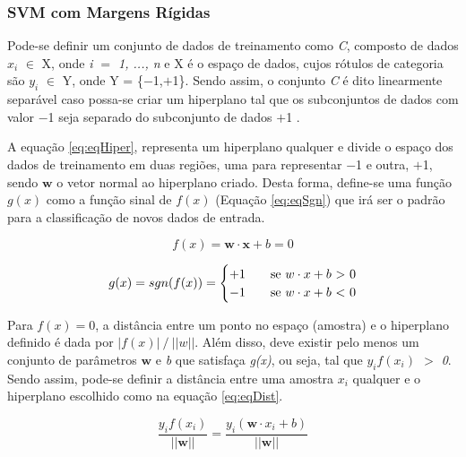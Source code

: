 \subsubsection{SVM com Margens Rígidas}

Pode-se definir um conjunto de dados de treinamento como \textit{C}, composto de dados \textit{$x_i$} $\in$ X, onde \textit{i $=$ 1, ..., n} e X é o espaço de dados, cujos rótulos de categoria são \textit{$y_i$} $\in$ Y, onde Y = \{$-$1,$+$1\}. Sendo assim, o conjunto \textit{C} é dito linearmente separável caso possa-se criar um hiperplano tal que os subconjuntos de dados com valor $-$1 seja separado do subconjunto de dados $+$1 .

A equação \ref{eq:eqHiper}, representa um hiperplano qualquer e divide o espaço dos dados de treinamento em duas regiões, uma para representar $-$1 e outra, $+$1, sendo $\boldsymbol{w}$ o vetor normal ao hiperplano criado. Desta forma, define-se uma função \textit{$g(x)$} como a função sinal de \textit{$f(x)$} (Equação \ref{eq:eqSgn}) que irá ser o padrão para a classificação de novos dados de entrada.

\begin{equation}
\label{eq:eqHiper}
 f(x)= \boldsymbol{w}\cdot \boldsymbol{x} + b = 0
\end{equation}

\begin{equation}
\label{eq:eqSgn}
 g(x) = sgn(f(x)) =
   \begin{cases}
    +1       & \quad \text{se } w\cdot x + b \text{ } $>$ \text{ } 0\\
    -1  & \quad \text{se } w\cdot x + b \text{ } $<$ \text{ } 0\\
   \end{cases}
\end{equation}

 Para $f(x) = 0$, a distância entre um ponto no espaço (amostra) e o hiperplano definido é dada por $|f(x)| \mathbin{/} ||w||$. Além disso, deve existir pelo menos um conjunto de parâmetros $\boldsymbol{w}$ e \textit{b} que satisfaça \textit{g(x)}, ou seja, tal que \textit{$y_i$$f(x_i)$ $>$ 0}. Sendo assim, pode-se definir a distância entre uma amostra $x_i$ qualquer e o hiperplano escolhido como na equação \ref{eq:eqDist}.

 \begin{equation}
\label{eq:eqDist}
  \frac{y_if(x_i)}{||\boldsymbol{w}||} = \frac{y_i(\boldsymbol{w} \cdot x_i + b)}{||\boldsymbol{w}||}
\end{equation}

